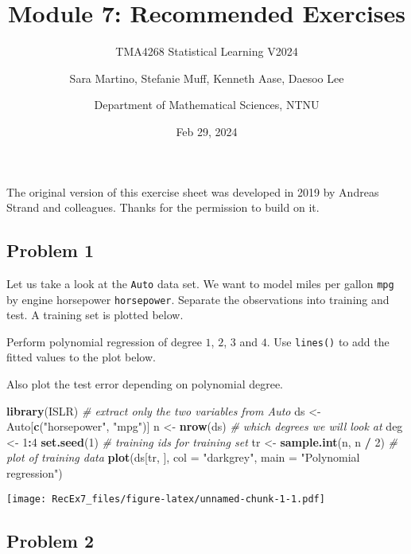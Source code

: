 \documentclass[
]{article}
\title{Module 7: Recommended Exercises}
\subtitle{TMA4268 Statistical Learning V2024}
\author{Sara Martino, Stefanie Muff, Kenneth Aase, Daesoo
Lee \and Department of Mathematical Sciences, NTNU}
\date{Feb 29, 2024}
\newenvironment{Shaded}{\begin{snugshade}}{\end{snugshade}}
\newcommand{\AttributeTok}[1]{\textcolor[rgb]{0.13,0.29,0.53}{#1}}
\newcommand{\CommentTok}[1]{\textcolor[rgb]{0.56,0.35,0.01}{\textit{#1}}}
\newcommand{\DecValTok}[1]{\textcolor[rgb]{0.00,0.00,0.81}{#1}}
\newcommand{\FunctionTok}[1]{\textcolor[rgb]{0.13,0.29,0.53}{\textbf{#1}}}
\newcommand{\NormalTok}[1]{#1}
\newcommand{\OtherTok}[1]{\textcolor[rgb]{0.56,0.35,0.01}{#1}}
\newcommand{\SpecialCharTok}[1]{\textcolor[rgb]{0.81,0.36,0.00}{\textbf{#1}}}
\newcommand{\StringTok}[1]{\textcolor[rgb]{0.31,0.60,0.02}{#1}}
\begin{document}
\maketitle

The original version of this exercise sheet was developed in 2019 by
Andreas Strand and colleagues. Thanks for the permission to build on it.

\hypertarget{problem-1}{%
\subsection{Problem 1}\label{problem-1}}

Let us take a look at the \texttt{Auto} data set. We want to model miles
per gallon \texttt{mpg} by engine horsepower \texttt{horsepower}.
Separate the observations into training and test. A training set is
plotted below.

Perform polynomial regression of degree \(1\), \(2\), \(3\) and \(4\).
Use \texttt{lines()} to add the fitted values to the plot below.

Also plot the test error depending on polynomial degree.

\begin{Shaded}
\begin{Highlighting}[]
\FunctionTok{library}\NormalTok{(ISLR)}
\CommentTok{\# extract only the two variables from Auto}
\NormalTok{ds }\OtherTok{\textless{}{-}}\NormalTok{ Auto[}\FunctionTok{c}\NormalTok{(}\StringTok{"horsepower"}\NormalTok{, }\StringTok{"mpg"}\NormalTok{)]}
\NormalTok{n }\OtherTok{\textless{}{-}} \FunctionTok{nrow}\NormalTok{(ds)}
\CommentTok{\# which degrees we will look at}
\NormalTok{deg }\OtherTok{\textless{}{-}} \DecValTok{1}\SpecialCharTok{:}\DecValTok{4}
\FunctionTok{set.seed}\NormalTok{(}\DecValTok{1}\NormalTok{)}
\CommentTok{\# training ids for training set}
\NormalTok{tr }\OtherTok{\textless{}{-}} \FunctionTok{sample.int}\NormalTok{(n, n }\SpecialCharTok{/} \DecValTok{2}\NormalTok{)}
\CommentTok{\# plot of training data}
\FunctionTok{plot}\NormalTok{(ds[tr, ], }\AttributeTok{col =} \StringTok{"darkgrey"}\NormalTok{, }\AttributeTok{main =} \StringTok{"Polynomial regression"}\NormalTok{)}
\end{Highlighting}
\end{Shaded}

\texttt{[image: RecEx7\_files/figure-latex/unnamed-chunk-1-1.pdf]}

\hypertarget{problem-2}{%
\subsection{Problem 2}\label{problem-2}}
\end{document}
